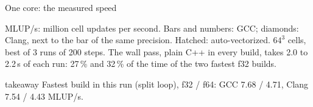 \documentclass[aspectratio=169,10pt,t]{beamer}
\newcommand{\takeaway}[1]{\par\vfill
  \begin{beamercolorbox}[wd=\textwidth,sep=4pt,rounded=true]{takeaway}
    \small #1
  \end{beamercolorbox}}
\begin{document}
\begin{frame}{One core: the measured speed}
  \vspace{1mm}
  \centering

  \vspace{0.5mm}
  {\scriptsize\color{psgray}MLUP/s: million cell updates per second. Bars and numbers: GCC; diamonds:
  Clang, next to the bar of the same precision. Hatched: auto-vectorized. $64^3$ cells, best of 3 runs
  of 200 steps. The wall pass, plain C++ in every build, takes 2.0 to 2.2\,s of each run: 27\,\% and
  32\,\% of the time of the two fastest f32 builds.\par}
  \takeaway{Fastest build in this run (split loop), f32 / f64: GCC 7.68 / 4.71, Clang 7.54 / 4.43 MLUP/s.}
\end{frame}
\end{document}
